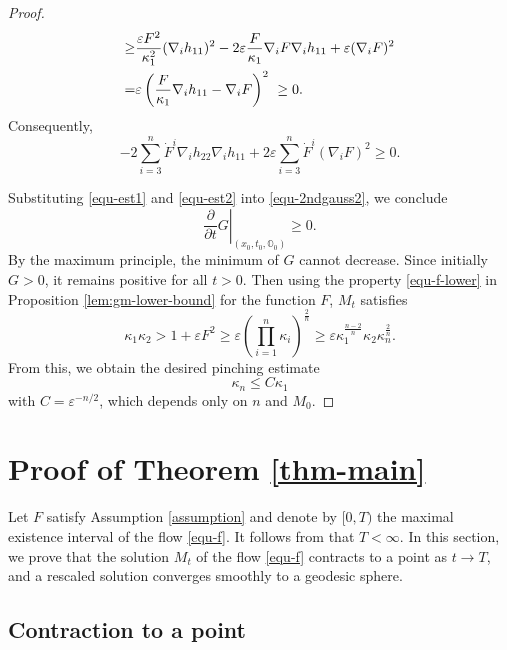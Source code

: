 \documentclass[11pt,reqno]{amsart}
\theoremstyle{remark}
\numberwithin{equation}{section}
\begin{document}
\begin{proof}
\begin{align*}
    	\geq & \dfrac{\varepsilon F^2}{\kappa_1^2}(\nabla_i h_{11})^2 - 2\varepsilon\dfrac{F}{\kappa_1}\nabla_i F \nabla_i h_{11} + \varepsilon(\nabla_i F)^2\notag\\
    	=& \varepsilon \left( \dfrac{F}{\kappa_1}\nabla_i h_{11} - \nabla_i F \right)^2\notag~
    	\geq  0.%
    \end{align*}
   Consequently,
    \begin{equation}
    	-2\sum\limits_{i=3}^n \dot{F}^i \nabla_i h_{22}\nabla_i h_{11} + 2\varepsilon \sum\limits_{i=3}^n \dot{F}^i (\nabla_i F)^2 \geq 0.
    	\label{equ-est2}
    \end{equation}

    Substituting \eqref{equ-est1} and \eqref{equ-est2} into \eqref{equ-2ndgauss2}, we conclude
    \begin{equation*}
    	\left.\frac{\partial}{\partial t}G\right|_{(x_0,t_0,\mathbb{O}_0)}\geq 0.
    \end{equation*}
    By the maximum principle, the minimum of $G$ cannot decrease. Since initially $G>0$, it remains positive for all $t>0$. Then using the property \eqref{equ-f-lower} in Proposition \ref{lem:gm-lower-bound} for the function $F$,  $M_t$ satisfies
    \begin{equation*}
    	\kappa_1 \kappa_2 >1+ \varepsilon F^2 \geq \varepsilon \left(\prod_{i=1}^n \kappa_i\right)^{\frac{2}{n}} \geq \varepsilon \kappa_1^{\frac{n-2}{n}} \kappa_2 \kappa_n^{\frac{2}{n}}.
    \end{equation*}
  From this, we obtain the desired pinching estimate 
    \[\kappa_n\leq C\kappa_1\] 
    with $C=\varepsilon^{-n/2}$, which depends only on $n$ and $M_0$.
\end{proof}


\section{Proof of Theorem \ref{thm-main}}\label{sec5}
Let $F$ satisfy Assumption \ref{assumption} and denote by $[0,T)$ the maximal existence interval of the flow \eqref{equ-f}. It follows from \cite[Proposition 1.1]{AC17} that $T<\infty$. In this section, we prove that the solution $M_t$ of the flow \eqref{equ-f} contracts to a point as $t\to T$, and a rescaled solution converges smoothly to a geodesic sphere. 

\subsection{Contraction to a point}
\end{document}
